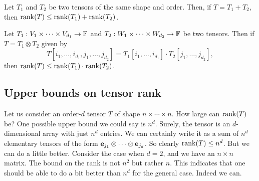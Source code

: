 \begin{lemma}\label{lem:tensor-subadditivity}
  Let $T_1$ and $T_2$ be two tensors of the same shape and order.
Then, if $T = T_1 + T_2$, then $\operatorname{rank}(T) \leq \operatorname{rank}(T_1) + \operatorname{rank}(T_2)$.
\end{lemma}

\begin{lemma}\label{lem:tensor-submultiplicativity}
  Let $T_1: V_1 \times \cdots \times V_{d_1} \rightarrow \mathbb{F}$ and $T_2: W_1 \times \cdots \times W_{d_2} \rightarrow \mathbb{F}$ be two tensors.
Then if $T = T_1 \otimes T_2$ given by
\[
T[i_1,\ldots, i_{d_1},j_1,\ldots, j_{d_2}] = T_1[i_1,\ldots, i_{d_1}] \cdot T_2[j_1,\ldots, j_{d_2}],
\]
then $\operatorname{rank}(T) \leq \operatorname{rank}(T_1) \cdot \operatorname{rank}(T_2)$. 
\end{lemma}


\subsection{Upper bounds on tensor rank}

Let us consider an order-$d$ tensor $T$ of shape $n \times \cdots \times n$.
How large can $\operatorname{rank}(T)$ be?
One possible upper bound we could say is $n^d$.
Surely, the tensor is an $d$-dimensional array with just $n^d$ entries.
We can certainly write it as a sum of $n^d$ elementary tensors of the form $\mathbf{e}_{j_1} \otimes \cdots \otimes \mathbf{e}_{j_d}$.
So clearly $\operatorname{rank}(T) \leq n^d$.
But we can do a little better.
Consider the case when $d=2$, and we have an $n\times n$ matrix.
The bound on the rank is not $n^2$ but rather $n$.
This indicates that one should be able to do a bit better than $n^d$ for the general case.
Indeed we can.

